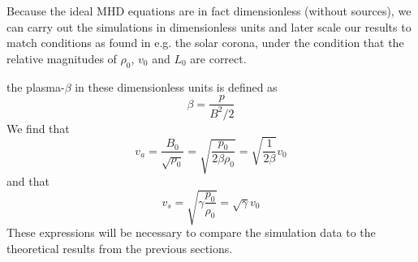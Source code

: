 Because the ideal MHD equations are in fact dimensionless (without sources), we can carry out the simulations in dimensionless units and later scale our results to match conditions as found in e.g. the solar corona, under the condition that the relative magnitudes of $\rho_0$, $v_0$ and $L_0$ are correct.

the plasma-$\beta$ in these dimensionless units is defined as
\begin{equation}
	\beta = \frac{p}{B^2/2}
	\label{eq:plasma-beta}
\end{equation}
We find that
\begin{equation}
	v_a = \frac{B_0}{\sqrt{\rho_0}} = \sqrt{ \frac{p_0}{2\beta\rho_0}} = \sqrt{ \frac{1}{2\beta}}v_0
	\label{eq:Alfven-code-units}
\end{equation}
and that
\begin{equation}
	v_s = \sqrt{ \gamma\frac{p_0}{\rho_0}} = \sqrt{\gamma}v_0
	\label{eq:sound-code-units}
\end{equation}
These expressions will be necessary to compare the simulation data to the theoretical results from the previous sections.
